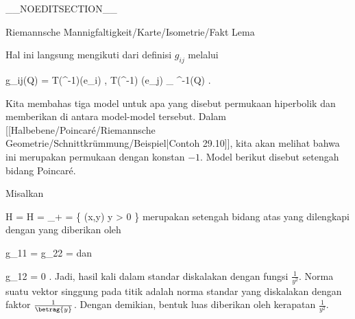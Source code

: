 __NOEDITSECTION__

{Riemannsche Mannigfaltigkeit/Karte/Isometrie/Fakt}
{Lema}
{}
{

\faktzusatz {}
\faktzusatz {}

}
{

Hal ini langsung mengikuti dari definisi $g_{ij}$ melalui

\mavergleichskettedisp
{\vergleichskette
{ g_{ij}(Q)
}
{ =} { \left\langle  T(\alpha^{-1})(e_i)  ,  T(\alpha^{-1}) (e_j)    \right\rangle_{ \alpha^{-1}(Q) }
}
{ } {
}
{ } {
}
{ } {
}
}
{}{}{.}

}


Kita membahas tiga model untuk apa yang disebut permukaan hiperbolik
 {} {}
dan memberikan
di antara model-model tersebut. Dalam
[[Halbebene/Poincaré/Riemannsche Geometrie/Schnittkrümmung/Beispiel|Contoh 29.10]],
kita akan melihat bahwa ini merupakan permukaan dengan
konstan $-1$. Model berikut disebut setengah bidang Poincaré.

{

Misalkan

\mavergleichskettedisp
{\vergleichskette
{ H = {\mathbb H}
}
{ =} { \R \times \R_+
}
{ =} { \left\{ (x,y)  \mid   y > 0        \right\}
}
{ } {
}
{ } {
}
}
{}{}{}
merupakan setengah bidang atas yang dilengkapi dengan
yang diberikan oleh

\mavergleichskettedisp
{\vergleichskette
{ g_{11}
}
{ =} { g_{22}
}
{ =} { {  }
}
{ } {
}
{ } {
}
}
{}{}{}
dan

\mavergleichskette
{\vergleichskette
{ g_{12}
}
{ = }{ 0
}
{  }{
}
{    }{
}
{   }{
}
}
{}{}{.}
Jadi, hasil kali dalam standar diskalakan dengan fungsi ${ \frac{   1  }{  y^2 } }$. Norma suatu vektor singgung pada titik
 adalah norma standar yang diskalakan dengan faktor ${ \frac{   1  }{  \betrag {  y  } } }$. Dengan demikian, bentuk luas diberikan oleh kerapatan ${ \frac{   1  }{  y^2 } }$.

}

